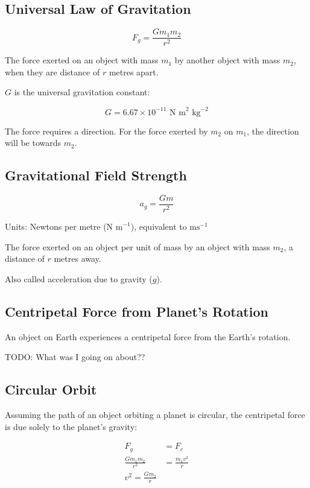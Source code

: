 \documentclass[a4paper,11pt]{report}
\begin{document}
\subsection{Universal Law of Gravitation}

$$
F_g = \frac{G m_1 m_2}{r^2}
$$

The force exerted on an object with mass $m_1$ by another object with mass
$m_2$, when they are distance of $r$ metres apart.

$G$ is the universal gravitation constant:

$$
G = 6.67 \times 10^{-11}\mbox{ N m}^2\mbox{ kg}^{-2}
$$

The force requires a direction. For the force exerted by $m_2$ on $m_1$, the
direction will be towards $m_2$.

\subsection{Gravitational Field Strength}

$$
a_g = \frac{G m}{r^2}
$$

Units: Newtons per metre ($\mbox{N m}^{-1}$), equivalent to $\mbox{ms}^{-1}$

The force exerted on an object per unit of mass by an object with mass $m_2$,
a distance of $r$ metres away.

Also called acceleration due to gravity ($g$).

\subsection{Centripetal Force from Planet's Rotation}

An object on Earth experiences a centripetal force from the Earth's rotation.

TODO: What was I going on about??

\subsection{Circular Orbit}

Assuming the path of an object orbiting a planet is circular, the centripetal
force is due solely to the planet's gravity:

$$
\begin{aligned}
F_g & = F_c \\
\frac{G m_1 m_2}{r^2} & = \frac{m_1 v^2}{r} \\
v^2 = \frac{G m_2}{r} \\
\end{aligned}
$$
\end{document}

